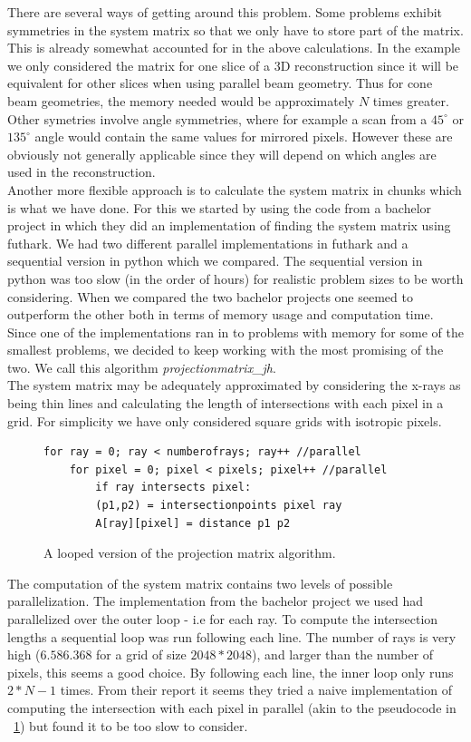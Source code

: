 There are several ways of getting around this problem. Some problems exhibit symmetries in the system matrix so that we only have to store part of the matrix. This is already somewhat accounted for in the above calculations. In the example we only considered the matrix for one slice of a 3D reconstruction since it will be equivalent for other slices when using parallel beam geometry. Thus for cone beam geometries, the memory needed would be approximately $N$ times greater. Other symetries involve angle symmetries, where for example a scan from a $45^{\circ}$ or $135^{\circ}$ angle would contain the same values for mirrored pixels. However these are obviously not generally applicable since they will depend on which angles are used in the reconstruction.\\
Another more flexible approach is to calculate the system matrix in chunks which is what we have done. For this we started by using the code from a bachelor project in which they did an implementation of finding the system matrix using futhark. We had two different parallel implementations in futhark and a sequential version in python which we compared. The sequential version in python was too slow (in the order of hours) for realistic problem sizes to be worth considering. When we compared the two bachelor projects one seemed to outperform the other both in terms of memory usage and computation time. Since one of the implementations ran in to problems with memory for some of the smallest problems, we decided to keep working with the most promising of the two. We call this algorithm \emph{projectionmatrix\_jh}.\\
The system matrix may be adequately approximated by considering the x-rays as being thin lines and calculating the length of intersections with each pixel in a grid. For simplicity we have only considered square grids with isotropic pixels.\\
\begin{figure}[h]
\begin{lstlisting}[frame=single]
for ray = 0; ray < numberofrays; ray++ //parallel
	for pixel = 0; pixel < pixels; pixel++ //parallel
		if ray intersects pixel:
        (p1,p2) = intersectionpoints pixel ray
        A[ray][pixel] = distance p1 p2
\end{lstlisting}
\label{sysmat}
  \caption{A looped version of the projection matrix algorithm.}
\end{figure}
The computation of the system matrix contains two levels of possible parallelization. The implementation from the bachelor project we used had parallelized over the outer loop - i.e for each ray. To compute the intersection lengths a sequential loop was run following each line. The number of rays is very high ($6.586.368$ for a grid of size $2048*2048$), and larger than the number of pixels, this seems a good choice. By following each line, the inner loop only runs $2*N-1$ times. From their report it seems they tried a naive implementation of computing the intersection with each pixel in parallel (akin to the pseudocode in ~\ref{sysmat}) but found it to be too slow to consider.\\
